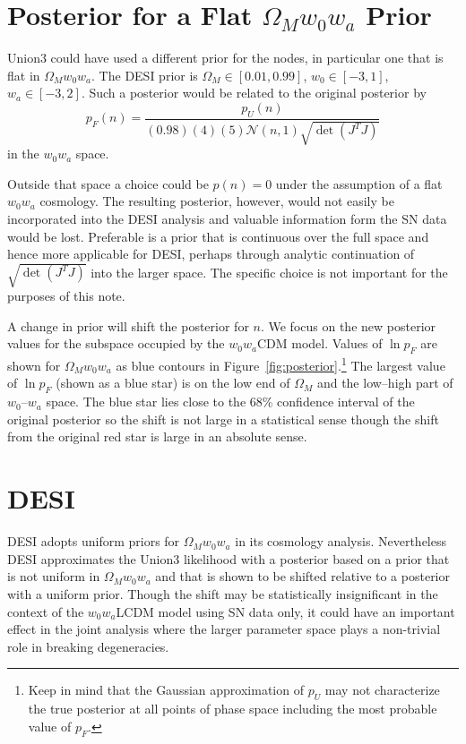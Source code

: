 \documentclass[11pt,a4paper]{article}
\begin{document}
\section{Posterior for a Flat  $\Omega_Mw_0w_a$  Prior}

Union3 could have used a different prior for the nodes, in particular one
that is flat in $\Omega_Mw_0w_a$.
The DESI prior is $\Omega_M \in [0.01,0.99]$, $w_0 \in [-3,1]$, $w_a \in [-3,2]$.
Such a posterior would be related to the original posterior by
\begin{equation}
p_F(n) = \frac{p_U(n)}{(0.98)(4)(5) \mathcal{N}(n,1)  \sqrt{\det{\left(J^T J\right)}}}
\end{equation}
in the $w_0w_a$ space.

Outside that space a choice could be $p(n)=0$ under the assumption
of a flat $w_0w_a$ cosmology.  The resulting posterior, however, would not easily be incorporated into the DESI analysis
and valuable information form the SN data would be lost.
Preferable is a prior that is continuous over the full space and hence more applicable for DESI,
perhaps through analytic continuation of $\sqrt{\det{\left(J^T J\right)}}$ into the larger space.
The specific choice is not important for the purposes of this note.

A change in prior will shift the posterior for $n$.   We focus on the new posterior values for the subspace occupied by
the $w_0w_a$CDM model.  Values of $\ln{p}_F$ are shown for $\Omega_Mw_0w_a$ as blue contours in Figure~\ref{fig:posterior}.\footnote{Keep in mind that the Gaussian approximation of $p_U$ may not characterize the true posterior at all points of
phase space including the most probable value of $p_F$.}
The largest value of $\ln{p}_F$ (shown as a blue star) is on the low end of $\Omega_M$ and the  low--high
part of $w_0$--$w_a$ space.
The blue star lies close to the 68\% confidence interval of the original posterior so the shift is not large in a statistical sense
though the shift from the original  red star is large in an absolute sense.

\section{DESI}
DESI  adopts uniform priors for $\Omega_Mw_0w_a$ in its cosmology analysis.
Nevertheless DESI approximates the Union3 likelihood with a posterior based on a prior that is not uniform in $\Omega_Mw_0w_a$
and that is shown to be shifted relative to a posterior with a uniform prior.
Though the shift may be statistically insignificant in the context of the $w_0w_a$LCDM model using SN data only,  it could have an important effect in the joint analysis
where the larger parameter space plays a non-trivial role in breaking degeneracies.
\end{document}
